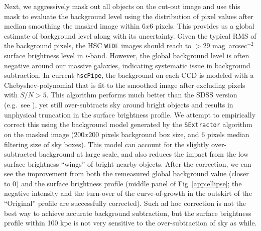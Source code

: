 \documentclass[a4paper,fleqn,usenatbib]{mnras}
\def\sb{mag~arcsec$^{-2}$}
\begin{document}
    Next, we aggressively mask out all objects on the cut-out image and use this mask
    to evaluate the background level using the distribution of pixel values after 
    median smoothing the masked image within $6x6$ pixels.
    This provides us a global estimate of background level along with its uncertainty. 
    Given the typical RMS of the background pixels, the HSC \texttt{WIDE} images 
    should reach to $> 29$ \sb surface brightness level in $i$-band.  
    However, the global background level is often negative around our massive 
    galaxies, indicating systematic issue in background subtraction.  
    In current \texttt{hscPipe}, the background on each CCD is modeled with a 
    Chebyshev-polynomial that is fit to the smoothed image after excluding pixels 
    with $S/N >5$.
    This algorithm performs much better than the SDSS version 
    (e.g.\ see \citealt{Blanton2011}), yet still over-subtracts sky around bright 
    objects and results in unphysical truncation in the surface brightness profile.
    We attempt to empirically correct this using the background model generated by 
    the \texttt{SExtractor} algorithm on the masked image 
    ($200x200$ pixels background box size, and 6 pixels median filtering size of 
    sky boxes).
    This model can account for the slightly over-subtracted background at large scale,
    and also reduces the impact from the low surface brightness ``wings'' of bright 
    nearby objects. 
    After the correction, we can see the improvement from both the remeasured global 
    background value (closer to 0) and the surface brightness profile (middle panel 
    of Fig~\ref{app:ellipse}; the negative intensity and the turn-over of the 
    curve-of-growth in the outskirt of the ``Original'' profile are successfully 
    corrected). 
    Such ad hoc correction is not the best way to achieve accurate background 
    subtraction, but the surface brightness profile within 100 kpc is not very
    sensitive to the over-subtraction of sky as while. 
    
\end{document}
